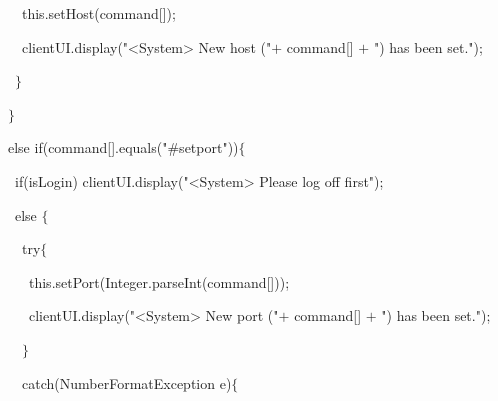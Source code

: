 {{\hlstd }{\hlstd\ \ \ \ \ }{\hlstd }{\hlkwa this}{\hlstd }{\hlsym .}{\hlstd }{\hlkwd setHost}{\hlstd }{\hlsym (}{\hlstd command}{\hlsym [}{\hlstd }{}{\hlstd }{\hlsym ]);}\leavevmode\par
{\hlstd }{\hlstd\ \ \ \ \ }{\hlstd clientUI}{\hlsym .}{\hlstd }{\hlkwd display}{\hlstd }{\hlsym (}{\hlstd }{\hlstr "$\mathord{<}$System$\mathord{>}$ New host ("}{\hlstd  }{\hlsym $\mathord{+}$ }{\hlstd command}{\hlsym [}{\hlstd }{}{\hlstd }{\hlsym ] $\mathord{+}$ }{\hlstd }{\hlstr ") has been set."}{\hlstd }{\hlsym );}\leavevmode\par
{\hlstd }{\hlstd\ \ \ \ }{\hlstd }{\hlsym $\}$}\leavevmode\par
{\hlstd }{\hlstd\ \ \ }{\hlstd }{\hlsym $\}$}\leavevmode\par
{\hlstd }{\hlstd\ \ \ }{\hlstd }{\hlkwa else if}{\hlstd }{\hlsym (}{\hlstd command}{\hlsym [}{\hlstd }{}{\hlstd }{\hlsym ].}{\hlstd }{\hlkwd equals}{\hlstd }{\hlsym (}{\hlstd }{\hlstr "\#setport"}{\hlstd }{\hlsym ))$\{$}\leavevmode\par
{\hlstd }{\hlstd\ \ \ \ }{\hlstd }{\hlkwa if}{\hlstd }{\hlsym (}{\hlstd isLogin}{\hlsym ) }{\hlstd clientUI}{\hlsym .}{\hlstd }{\hlkwd display}{\hlstd }{\hlsym (}{\hlstd }{\hlstr "$\mathord{<}$System$\mathord{>}$ Please log off first"}{\hlstd }{\hlsym );}\leavevmode\par
{\hlstd }{\hlstd\ \ \ \ }{\hlstd }{\hlkwa else }{\hlstd }{\hlsym $\{$}\leavevmode\par
{\hlstd }{\hlstd\ \ \ \ \ }{\hlstd }{\hlkwa try}{\hlstd }{\hlsym $\{$}\leavevmode\par
{\hlstd }{\hlstd\ \ \ \ \ \ }{\hlstd }{\hlkwa this}{\hlstd }{\hlsym .}{\hlstd }{\hlkwd setPort}{\hlstd }{\hlsym (}{\hlstd }{\hlkwc Integer}{\hlstd }{\hlsym .}{\hlstd }{\hlkwd parseInt}{\hlstd }{\hlsym (}{\hlstd command}{\hlsym [}{\hlstd }{}{\hlstd }{\hlsym ]));}\leavevmode\par
{\hlstd }{\hlstd\ \ \ \ \ \ }{\hlstd clientUI}{\hlsym .}{\hlstd }{\hlkwd display}{\hlstd }{\hlsym (}{\hlstd }{\hlstr "$\mathord{<}$System$\mathord{>}$ New port ("}{\hlstd  }{\hlsym $\mathord{+}$ }{\hlstd command}{\hlsym [}{\hlstd }{}{\hlstd }{\hlsym ] $\mathord{+}$ }{\hlstd }{\hlstr ") has been set."}{\hlstd }{\hlsym );}\leavevmode\par
{\hlstd }{\hlstd\ \ \ \ \ }{\hlstd }{\hlsym $\}$}\leavevmode\par
{\hlstd }{\hlstd\ \ \ \ \ }{\hlstd }{\hlkwa catch}{\hlstd }{\hlsym (}{\hlstd }{\hlkwc NumberFormatException }{\hlstd e}{\hlsym )$\{$}\leavevmode\par
}
